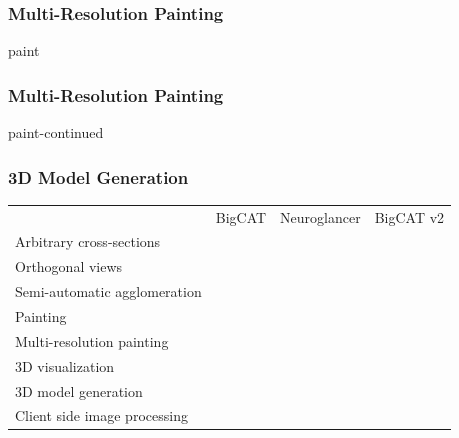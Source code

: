 \documentclass[aspectratio=169,table]{beamer}
\newcommand{\cmark}{\ding{51}}%
\newcommand{\xmark}{\ding{55}}%
\newcommand{\gcmark}{{\color{green}\cmark}}%
\newcommand{\ycmark}{{\color{yellow}\cmark}}%
\newcommand{\rxmark}{{\color{red}\xmark}}%
\begin{document}
\def\colorOne{red}
\def\colorTwo{blue}
\def\colorThree{yellow}
\def\colorFour{green}
\def\colorFive{magenta}
\def\cellSize{1.4em}
\begin{frame}
    \frametitle{Multi-Resolution Painting}
    \tikzexternalenable
    \vspace{4em}
    {paint}
    \tikzexternaldisable
\end{frame}

\begin{frame}
    \frametitle{Multi-Resolution Painting}
    \vspace{4em}
    \tikzexternalenable
    {paint-continued}
    \tikzexternaldisable
\end{frame}

\begin{frame}
    \frametitle{3D Model Generation}
    \small
    \vspace{1cm}
    \begin{table}
        \centering
        \begin{tabular}{lccc}
                                                  & BigCAT & Neuroglancer & BigCAT v2 \\
          Arbitrary cross-sections                & \gcmark & \gcmark & \gcmark \\
          Orthogonal views                        & \rxmark & \gcmark & \gcmark \\
          Semi-automatic agglomeration            & \rxmark & \rxmark & \gcmark \\
          Painting                                & \gcmark & \rxmark & \gcmark \\
          Multi-resolution painting               & \rxmark & \rxmark & \gcmark \\
          \rowcolor{black!20} 3D visualization    & \rxmark & \gcmark & \gcmark \\
          \rowcolor{black!20} 3D model generation & \rxmark & \rxmark & \gcmark \\
          Client side image processing            & \rxmark & \ycmark & \gcmark \\
        \end{tabular}
    \end{table}
\end{frame}
\end{document}
